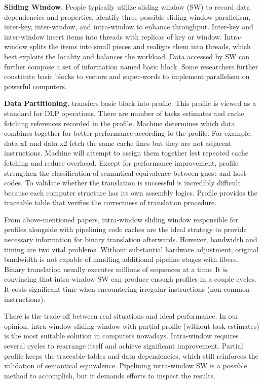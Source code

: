 \documentclass[sigconf, nonacm, natbib=false]{acmart}
\begin{document}
{\bf Sliding Window.} People typically utilize sliding window (SW) to record data dependencies and properties. \parencite{sliding_window_parallelism} identify three possible sliding window parallelism, inter-key, inter-window, and intra-window to enhance throughput. Inter-key and inter-window insert items into threads with replicas of key or window. Intra-window splits the items into small pieces and realigns them into threads, which best exploits the locality and balances the workload. Data accessed by SW can further compose a set of information named basic block\parencite{basic_block}. Some researchers further constitute basic blocks to vectors\parencite{vector_parallelism} and super-words\parencite{superword_parallelism} to implement parallelism on powerful computers. 

{\bf Data Partitioning.} \parencite{data_partition} transfers basic block into profile. This profile is viewed as a standard for DLP operations. There are number of tasks estimates and cache fetching references recorded in the profile. Machine determines which data combines together for better performance according to the profile. For example, data x1 and data x2 fetch the same cache lines but they are not adjacent instructions. Machine will attempt to assign them together lest repeated cache fetching and reduce overhead. Except for performance improvement, profile strengthen the classification of semantical equivalence between guest and host codes. To validate whether the translation is successful is incredibly difficult because each computer structure has its own assembly logics. Profile provides the traceable table that verifies the correctness of translation procedure. 

From above-mentioned papers, intra-window sliding window responsible for profiles alongside with pipelining code caches are the ideal strategy to provide necessary information for binary translation afterwards. However, bandwidth and timing are two vital problems. Without substantial hardware adjustment, original bandwidth is not capable of handling additional pipeline stages with fibers. Binary translation usually executes millions of sequences at a time. It is convincing that intra-window SW can produce enough profiles in a couple cycles. It costs significant time when encountering irregular instructions (non-common instructions). 

There is the trade-off between real situations and ideal performance. In our opinion, intra-window sliding window with partial profile (without task estimates) is the most suitable solution in computers nowadays. Intra-window requires several cycles to rearrange itself and achieve significant improvement. Partial profile keeps the traceable tables and data dependencies, which still reinforces the validation of semantical equivalence. Pipelining intra-window SW is a possible method to accomplish, but it demands efforts to inspect the results.
\end{document}
